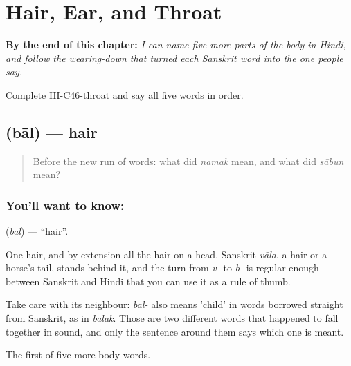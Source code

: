 
\chapter{Hair, Ear, and Throat}
\label{ch:hi-body-more}

\begin{chapteropening}
\textbf{By the end of this chapter:} \emph{I can name five more parts of the body in Hindi, and follow the wearing-down that turned each Sanskrit word into the one people say.}

Complete HI-C46-throat and say all five words in order.
\end{chapteropening}

\section[\texorpdfstring{\hi{बाल} (bāl)}{बाल (bāl)}]{ (bāl) — hair}

\label{lesson:HI-C46-hair}



\begin{quote}
Before the new run of words: what did \emph{namak} mean, and what did \emph{sābun} mean?
\end{quote}

\subsection*{You'll want to know: }
\textbf{} (\emph{bāl}) — \textquotedblleft{}hair\textquotedblright{}.

One hair, and by extension all the hair on a head. Sanskrit \emph{vāla}, a hair or a horse's tail, stands behind it, and the turn from \emph{v-} to \emph{b-} is regular enough between Sanskrit and Hindi that you can use it as a rule of thumb.

Take care with its neighbour: \emph{bāl-} also means 'child' in words borrowed straight from Sanskrit, as in \emph{bālak}. Those are two different words that happened to fall together in sound, and only the sentence around them says which one is meant.

\begin{grammarlens}[title={What you've built}]
The first of five more body words.
\end{grammarlens}


